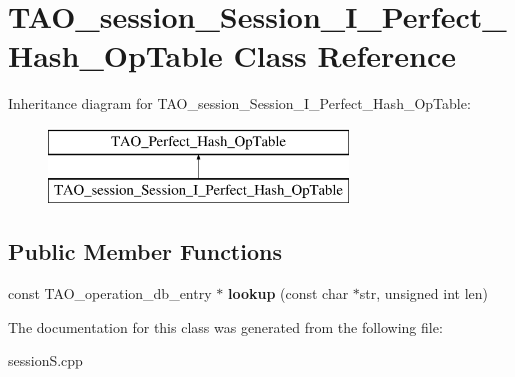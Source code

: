 \section{T\+A\+O\+\_\+session\+\_\+\+Session\+\_\+\+I\+\_\+\+Perfect\+\_\+\+Hash\+\_\+\+Op\+Table Class Reference}
\label{classTAO__session__Session__I__Perfect__Hash__OpTable}
Inheritance diagram for T\+A\+O\+\_\+session\+\_\+\+Session\+\_\+\+I\+\_\+\+Perfect\+\_\+\+Hash\+\_\+\+Op\+Table\+:\begin{figure}[H]
\begin{center}
\leavevmode
\includegraphics[height=2.000000cm]{classTAO__session__Session__I__Perfect__Hash__OpTable}
\end{center}
\end{figure}
\subsection*{Public Member Functions}
\begin{DoxyCompactItemize}
\item 
const T\+A\+O\+\_\+operation\+\_\+db\+\_\+entry $\ast$ {\bfseries lookup} (const char $\ast$str, unsigned int len)\label{classTAO__session__Session__I__Perfect__Hash__OpTable_a4efa37ee9467c9f3184de346db55233f}

\end{DoxyCompactItemize}


The documentation for this class was generated from the following file\+:\begin{DoxyCompactItemize}
\item 
session\+S.\+cpp\end{DoxyCompactItemize}
